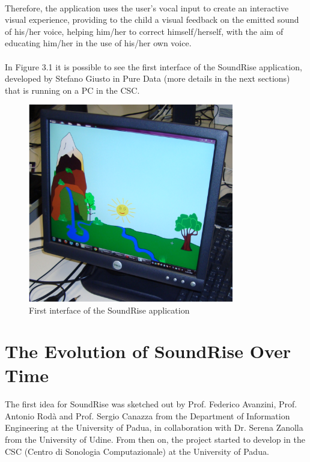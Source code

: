 \paragraph{}
Therefore, the application uses the user's vocal input to create an interactive visual experience, providing to the child a visual feedback on the emitted sound of his/her voice, helping him/her to correct himself/herself, with the aim of educating him/her in the use of his/her own voice.

\paragraph{}
In Figure 3.1 it is possible to see the first interface of the SoundRise application, developed by Stefano Giusto \cite{giusto2012} in Pure Data (more details in the next sections) that is running on a PC in the CSC.

\begin{figure}[h]
    \centering
    \includegraphics[width=0.8\textwidth]{res/images/background/soundrise-1.png}
    \caption{First interface of the SoundRise application}
    \label{fig:soundrise-logo}
\end{figure}

\section{The Evolution of SoundRise Over Time}
\label{sec:evolutionOfSoundRise}

\paragraph{}
The first idea for SoundRise was sketched out by Prof. Federico Avanzini, Prof. Antonio Rodà and Prof. Sergio Canazza from the Department of Information Engineering at the University of Padua, in collaboration with Dr. Serena Zanolla from the University of Udine. From then on, the project started to develop in the CSC (Centro di Sonologia Computazionale) at the University of Padua.

